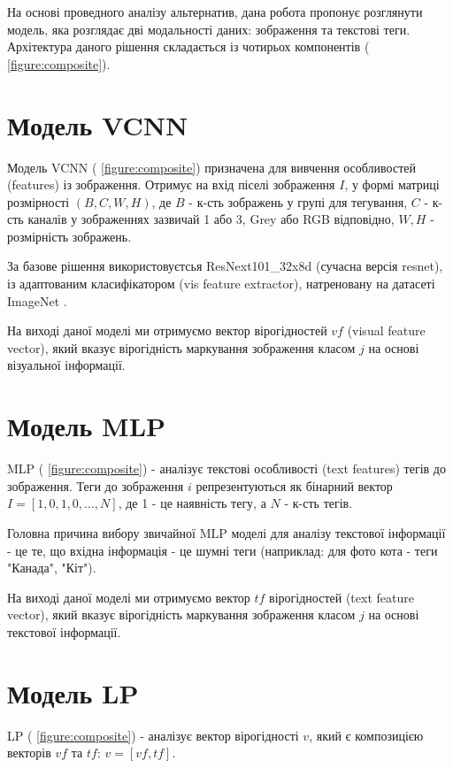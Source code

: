 \documentclass{udstu}
\begin{document}
На основі проведного аналізу альтернатив, дана робота пропонує розглянути
модель, яка розглядає дві модальності даних: зображення та текстові теги.
Архітектура даного рішення складається із чотирьох компонентів (\figurename{ \ref{figure:composite}}).


\section{Модель VCNN}

Модель VCNN (\figurename{ \ref{figure:composite}}) призначена для вивчення особливостей (features) із зображення.
Отримує на вхід піселі зображення $I$, у формі матриці розмірності $(B,C,W,H)$, де
$B$ - к-сть зображень у групі для тегування,
$C$ - к-сть каналів у зображеннях зазвичай 1 або 3, Grey або RGB відповідно,
$W,H$ - розмірність зображень.

За базове рішення використовуєтсья ResNext101\_32x8d \cite{resnext} (сучасна версія resnet),
із адаптованим класифікатором (vis feature extractor), натреновану на датасеті ImageNet \cite{deng2009imagenet}.

На виході даної моделі ми отримуємо вектор вірогідностей $vf$ (visual feature vector),
який вказує вірогідність маркування зображення класом $j$ на основі візуальної інформації.


\section{Модель MLP}

MLP (\figurename{ \ref{figure:composite}}) - аналізує текстові особливості (text features) тегів до зображення.
Теги до зображення $i$ репрезентуються як бінарний вектор $I = [1,0,1,0, ..., N]$,
де 1 - це наявність тегу, а $N$ - к-сть тегів.

Головна причина вибору звичайної MLP моделі для аналізу текстової інформації - це
те, що вхідна інформація - це шумні теги (наприклад: для фото кота - теги "Канада", "Кіт").

На виході даної моделі ми отримуємо вектор $tf$ вірогідностей (text feature vector),
який вказує вірогідність маркування зображення класом $j$ на основі текстової інформації.


\section{Модель LP}

LP (\figurename{ \ref{figure:composite}}) - аналізує вектор вірогідності $v$,
який є композицією векторів $vf$ та $tf$: $v = [vf, tf]$.
\end{document}
